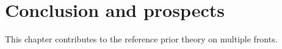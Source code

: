 















\section{Conclusion and prospects}\label{sec:PSGSA:conclusion}


This chapter contributes to the reference prior theory on multiple fronts.

